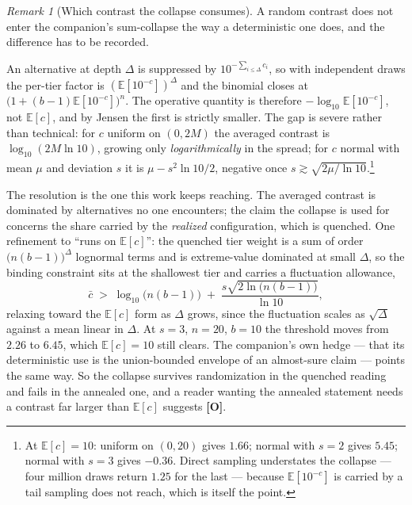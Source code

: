 \documentclass[11pt]{article}
\numberwithin{equation}{section}
\theoremstyle{plain}
\theoremstyle{definition}
\theoremstyle{remark}
\newtheorem{remark}[theorem]{Remark}
\newcommand{\E}{\mathbb{E}}
\begin{document}
\begin{remark}[Which contrast the collapse consumes]\label{sch:rem:n2}
A random contrast does not enter the companion's sum-collapse the way a
deterministic one does, and the difference has to be recorded.

An alternative at depth $\Delta$ is suppressed by
$10^{-\sum_{i\le\Delta}c_i}$, so with independent draws the per-tier
factor is $(\E[10^{-c}])^{\Delta}$ and the binomial closes at
$\bigl(1+(b-1)\E[10^{-c}]\bigr)^{n}$. The operative quantity is
therefore $-\log_{10}\E[10^{-c}]$, not $\E[c]$, and by Jensen the first
is strictly smaller. The gap is severe rather than technical: for $c$
uniform on $(0,2M)$ the averaged contrast is $\log_{10}(2M\ln10)$,
growing only \emph{logarithmically} in the spread; for $c$ normal with
mean $\mu$ and deviation $s$ it is $\mu-s^{2}\ln10/2$, negative once
$s\gtrsim\sqrt{2\mu/\ln10}$.\footnote{At $\E[c]=10$: uniform on
$(0,20)$ gives $1.66$; normal with $s=2$ gives $5.45$; normal with $s=3$
gives $-0.36$. Direct sampling understates the collapse --- four million
draws return $1.25$ for the last --- because $\E[10^{-c}]$ is carried by
a tail sampling does not reach, which is itself the point.}

The resolution is the one this work keeps reaching. The averaged
contrast is dominated by alternatives no one encounters; the claim the
collapse is used for concerns the share carried by the \emph{realized}
configuration, which is quenched. One refinement to ``runs on $\E[c]$'':
the quenched tier weight is a sum of order $\bigl(n(b-1)\bigr)^{\Delta}$
lognormal terms and is extreme-value dominated at small $\Delta$, so the
binding constraint sits at the shallowest tier and carries a fluctuation
allowance,
\begin{equation}\label{sch:eq:quenchedcrit}
\bar c\;>\;\log_{10}\bigl(n(b-1)\bigr)
\;+\;\frac{s\sqrt{2\ln\bigl(n(b-1)\bigr)}}{\ln10},
\end{equation}
relaxing toward the $\E[c]$ form as $\Delta$ grows, since the fluctuation
scales as $\sqrt\Delta$ against a mean linear in $\Delta$. At $s=3$,
$n=20$, $b=10$ the threshold moves from $2.26$ to $6.45$, which
$\E[c]=10$ still clears. The companion's
own hedge --- that its deterministic use is the union-bounded envelope
of an almost-sure claim --- points the same way. So the collapse
survives randomization in the quenched reading and fails in the annealed
one, and a reader wanting the annealed statement needs a contrast far
larger than $\E[c]$ suggests \textbf{[O]}.
\end{remark}
\end{document}
